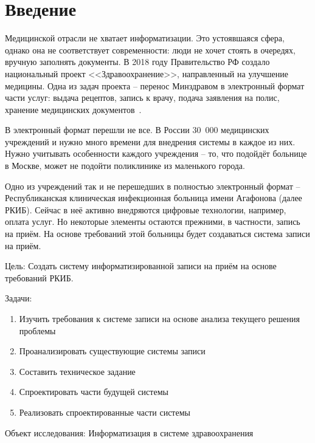 \documentclass[a4paper,article]{article}
\begin{document}
\begin{sloppypar}
    \newpage

    \section*{Введение}

        Медицинской отрасли не хватает информатизации. Это устоявшаяся сфера, однако она не соответствует современности: люди не хочет стоять в очередях, вручную заполнять документы. В 2018 году Правительство РФ создало национальный проект <<Здравоохранение>>, направленный на улучшение медицины. Одна из задач проекта -- перенос Минздравом в электронный формат части услуг: выдача рецептов, запись к врачу, подача заявления на полис, хранение медицинских документов~\cite{natsproektzdravoohranenie}.

        В электронный формат перешли не все. В России 30~000 медицинских учреждений и нужно много времени для внедрения системы в каждое из них. Нужно учитывать особенности каждого учреждения -- то, что подойдёт больнице в Москве, может не подойти поликлинике из маленького города.

        Одно из учреждений так и не перешедших в полностью электронный формат -- Республиканская клиническая инфекционная больница имени Агафонова (далее РКИБ). Сейчас в неё активно внедряются цифровые технологии, например, оплата услуг. Но некоторые элементы остаются прежними, в частности, запись на приём. На основе требований этой больницы будет создаваться система записи на приём.

        Цель: Создать систему информатизированной записи на приём на основе
        требований РКИБ.

        Задачи:

        \begin{enumerate}[nolistsep]
            \item Изучить требования к системе записи на основе анализа текущего решения проблемы
            \item Проанализировать существующие системы записи
            \item Составить техническое задание
            \item Спроектировать части будущей системы
            \item Реализовать спроектированные части системы
        \end{enumerate}

        Объект исследования: Информатизация в системе здравоохранения


\end{sloppypar}
\end{document}
